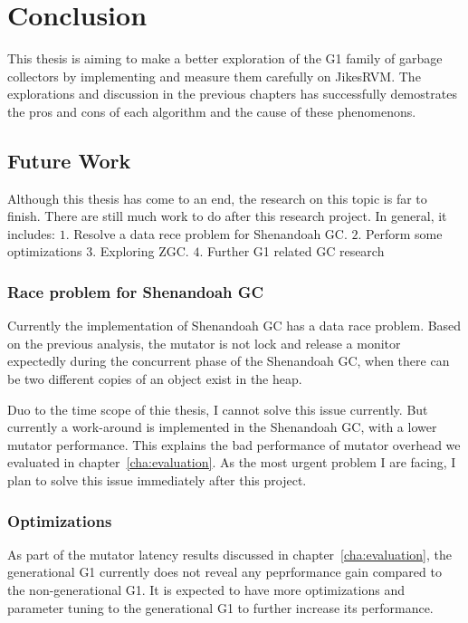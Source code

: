\chapter{Conclusion}
\label{cha:conc}

This thesis is aiming to make a better exploration of the G1 family of garbage collectors
by implementing and measure them carefully on JikesRVM.
The explorations and discussion in the previous chapters has successfully demostrates
the pros and cons of each algorithm and the cause of these phenomenons.

\section{Future Work}
\label{sec:future}

Although this thesis has come to an end, the research on this topic is far to finish.
There are still much work to do after this research project. In general, it includes:
$1.$ Resolve a data rece problem for Shenandoah GC.
$2.$ Perform some optimizations
$3.$ Exploring ZGC.
$4.$ Further G1 related GC research

\subsection{Race problem for Shenandoah GC}

Currently the implementation of Shenandoah GC has a data race problem.
Based on the previous analysis, the mutator is not lock and release a monitor
expectedly during the concurrent phase of the Shenandoah GC, when there can be
two different copies of an object exist in the heap.

Duo to the time scope of thie thesis, I cannot solve this issue currently.
But currently a work-around is implemented in the Shenandoah GC, with a lower mutator performance.
This explains the bad performance of mutator overhead we evaluated in chapter~\ref{cha:evaluation}.
As the most urgent problem I are facing, I plan to solve this issue immediately after
this project.

\subsection{Optimizations}

As part of the mutator latency results discussed in chapter~\ref{cha:evaluation},
the generational G1 currently does not reveal any peprformance gain compared to
the non-generational G1. It is expected to have more optimizations and parameter
tuning to the generational G1 to further increase its performance.

